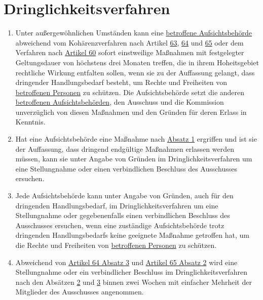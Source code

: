 \chapter{Dringlichkeitsverfahren}
\label{ch:66}


\begin{enumerate}

  \item Unter außergewöhnlichen Umständen kann eine \hyperref[itm:04-22]{betroffene Aufsichtsbehörde} abweichend vom Kohärenzverfahren nach
   Artikel \hyperref[ch:63]{63}, \hyperref[ch:64]{64} und \hyperref[ch:65]{65} oder dem Verfahren nach \hyperref[ch:60]
   {Artikel 60} sofort einstweilige Maßnahmen mit festgelegter Geltungsdauer von höchstens drei Monaten treffen, die in
   ihrem Hoheitsgebiet rechtliche Wirkung entfalten sollen, wenn sie zu der Auffassung gelangt, dass dringender
   Handlungsbedarf besteht, um Rechte und Freiheiten von \hyperref[itm:04-1]{betroffenen Personen} zu schützen. Die Aufsichtsbehörde setzt
   die anderen \hyperref[itm:04-22]{betroffenen Aufsichtsbehörden}, den Ausschuss und die Kommission unverzüglich von diesen Maßnahmen und
   den Gründen für deren Erlass in Kenntnis.
  \label{itm:66-1}

  \item Hat eine Aufsichtsbehörde eine Maßnahme nach \hyperref[itm:66-1]{Absatz 1} ergriffen und ist sie der Auffassung,
   dass dringend endgültige Maßnahmen erlassen werden müssen, kann sie unter Angabe von Gründen im
   Dringlichkeitsverfahren um eine Stellungnahme oder einen verbindlichen Beschluss des Ausschusses ersuchen.
  \label{itm:66-2}

  \item Jede Aufsichtsbehörde kann unter Angabe von Gründen, auch für den dringenden Handlungsbedarf, im
   Dringlichkeitsverfahren um eine Stellungnahme oder gegebenenfalls einen verbindlichen Beschluss des Ausschusses
   ersuchen, wenn eine zuständige Aufsichtsbehörde trotz dringenden Handlungsbedarfs keine geeignete Maßnahme getroffen
   hat, um die Rechte und Freiheiten von \hyperref[itm:04-1]{betroffenen Personen} zu schützen.
  \label{itm:66-3}

  \item Abweichend von \hyperref[itm:64-3]{Artikel 64 Absatz 3} und \hyperref[itm:65-2]{Artikel 65 Absatz 2} wird eine
   Stellungnahme oder ein verbindlicher Beschluss im Dringlichkeitsverfahren nach den Absätzen \hyperref[itm:66-2]
   {2} und \hyperref[itm:66-3]{3} binnen zwei Wochen mit einfacher Mehrheit der Mitglieder des Ausschusses angenommen.
  \label{itm:66-4}

\end{enumerate}


